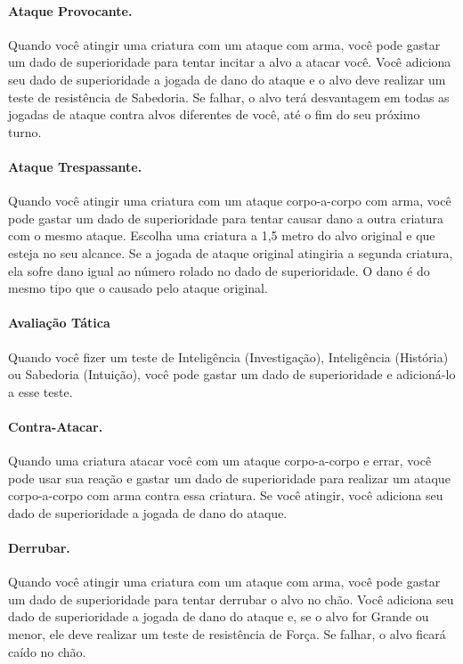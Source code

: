 \begin{multicols}{2}
\paragraph{Ataque Provocante.} Quando você atingir uma criatura com um ataque
com arma, você pode gastar um dado de superioridade para tentar incitar a alvo a
atacar você. Você adiciona seu dado de superioridade a jogada de dano do ataque
e o alvo deve realizar um teste de resistência de Sabedoria. Se falhar, o alvo
terá desvantagem em todas as jogadas de ataque contra alvos diferentes de você,
até o fim do seu próximo turno.

\paragraph{Ataque Trespassante.} Quando você atingir uma criatura com um ataque
corpo-a-corpo com arma, você pode gastar um dado de superioridade para tentar
causar dano a outra criatura com o mesmo ataque. Escolha uma criatura a 1,5
metro do alvo original e que esteja no seu alcance. Se a jogada de ataque
original atingiria a segunda criatura, ela sofre dano igual ao número rolado no
dado de superioridade. O dano é do mesmo tipo que o causado pelo ataque
original.

\paragraph{Avaliação Tática} Quando você fizer um teste de Inteligência
(Investigação), Inteligência (História) ou Sabedoria (Intuição), você pode
gastar um dado de superioridade e adicioná-lo a esse teste.

\paragraph{Contra-Atacar.} Quando uma criatura atacar você com um ataque
corpo-a-corpo e errar, você pode usar sua reação e gastar um dado de
superioridade para realizar um ataque corpo-a-corpo com arma contra essa
criatura.  Se você atingir, você adiciona seu dado de superioridade a jogada de
dano do ataque.

\paragraph{Derrubar.} Quando você atingir uma criatura com um ataque com arma,
você pode gastar um dado de superioridade para tentar derrubar o alvo no chão.
Você adiciona seu dado de superioridade a jogada de dano do ataque e, se o alvo
for Grande ou menor, ele deve realizar um teste de resistência de Força. Se
falhar, o alvo ficará caído no chão.


\end{multicols}
